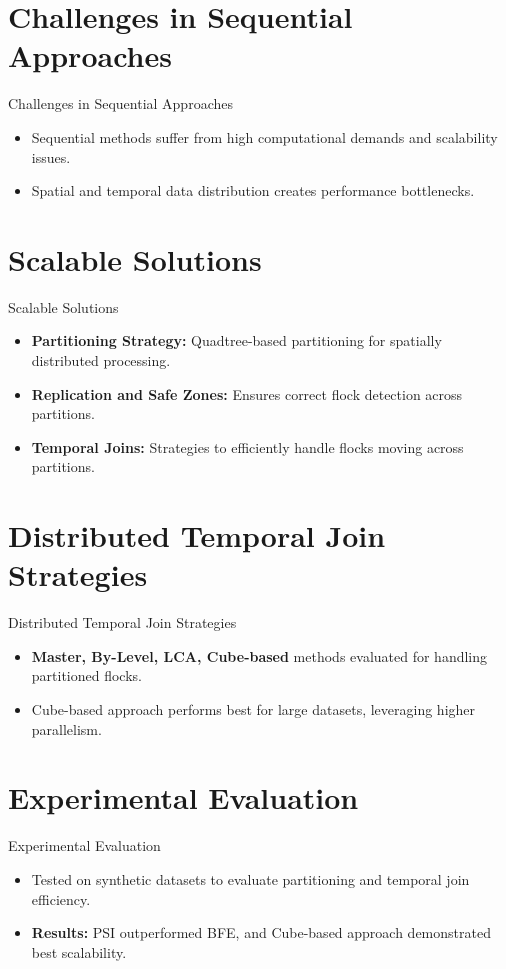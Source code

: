 \documentclass{beamer}
\begin{document}
\section{Challenges in Sequential Approaches}
\begin{frame}{Challenges in Sequential Approaches}
    \begin{itemize}
        \item Sequential methods suffer from high computational demands and scalability issues.
        \item Spatial and temporal data distribution creates performance bottlenecks.
    \end{itemize}
\end{frame}

\section{Scalable Solutions}
\begin{frame}{Scalable Solutions}
    \begin{itemize}
        \item \textbf{Partitioning Strategy:} Quadtree-based partitioning for spatially distributed processing.
        \item \textbf{Replication and Safe Zones:} Ensures correct flock detection across partitions.
        \item \textbf{Temporal Joins:} Strategies to efficiently handle flocks moving across partitions.
    \end{itemize}
\end{frame}

\section{Distributed Temporal Join Strategies}
\begin{frame}{Distributed Temporal Join Strategies}
    \begin{itemize}
        \item \textbf{Master, By-Level, LCA, Cube-based} methods evaluated for handling partitioned flocks.
        \item Cube-based approach performs best for large datasets, leveraging higher parallelism.
    \end{itemize}
\end{frame}

\section{Experimental Evaluation}
\begin{frame}{Experimental Evaluation}
    \begin{itemize}
        \item Tested on synthetic datasets to evaluate partitioning and temporal join efficiency.
        \item \textbf{Results:} PSI outperformed BFE, and Cube-based approach demonstrated best scalability.
    \end{itemize}
\end{frame}
\end{document}
